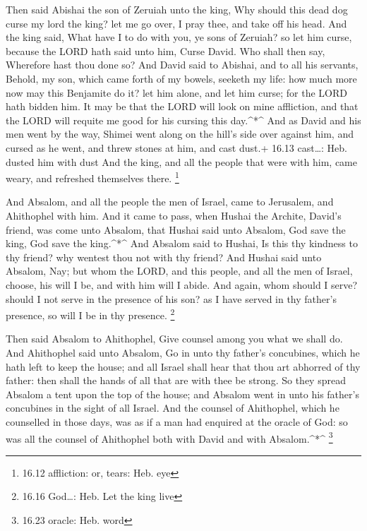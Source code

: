  Then said Abishai the son of Zeruiah unto the king, Why
should this dead dog curse my lord the king? let me go over, I pray
thee, and take off his head.  And the king said, What have
I to do with you, ye sons of Zeruiah? so let him curse, because the LORD
hath said unto him, Curse David. Who shall then say, Wherefore hast thou
done so?  And David said to Abishai, and to all his
servants, Behold, my son, which came forth of my bowels, seeketh my
life: how much more now may this Benjamite do it? let him alone, and let
him curse; for the LORD hath bidden him.  It may be that
the LORD will look on mine affliction, and that the LORD will requite me
good for his cursing this day.\^{}*\^{}  And as David and
his men went by the way, Shimei went along on the hill's side over
against him, and cursed as he went, and threw stones at him, and cast
dust.+ 16.13 cast\ldots: Heb. dusted him with dust  And the
king, and all the people that were with him, came weary, and refreshed
themselves there. \footnote{16.12 affliction: or, tears: Heb. eye}

 And Absalom, and all the people the men of Israel, came to
Jerusalem, and Ahithophel with him.  And it came to pass,
when Hushai the Archite, David's friend, was come unto Absalom, that
Hushai said unto Absalom, God save the king, God save the king.\^{}*\^{}
 And Absalom said to Hushai, Is this thy kindness to thy
friend? why wentest thou not with thy friend?  And Hushai
said unto Absalom, Nay; but whom the LORD, and this people, and all the
men of Israel, choose, his will I be, and with him will I abide.
 And again, whom should I serve? should I not serve in the
presence of his son? as I have served in thy father's presence, so will
I be in thy presence. \footnote{16.16 God\ldots: Heb. Let the king live}

 Then said Absalom to Ahithophel, Give counsel among you
what we shall do.  And Ahithophel said unto Absalom, Go in
unto thy father's concubines, which he hath left to keep the house; and
all Israel shall hear that thou art abhorred of thy father: then shall
the hands of all that are with thee be strong.  So they
spread Absalom a tent upon the top of the house; and Absalom went in
unto his father's concubines in the sight of all Israel. 
And the counsel of Ahithophel, which he counselled in those days, was as
if a man had enquired at the oracle of God: so was all the counsel of
Ahithophel both with David and with Absalom.\^{}*\^{} \footnote{16.23
  oracle: Heb. word}

